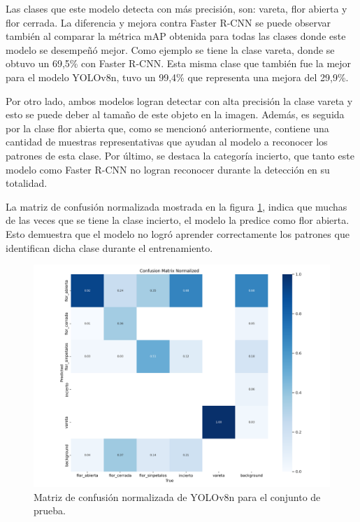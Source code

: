 Las clases que este modelo detecta con más precisión, son: vareta, flor abierta y flor cerrada. La diferencia y mejora contra Faster R-CNN se puede observar también al comparar la métrica mAP obtenida para todas las clases donde este modelo se desempeñó mejor. Como ejemplo se tiene la clase vareta, donde se obtuvo un 69,5\% con Faster R-CNN. Esta misma clase que también fue la mejor para el modelo YOLOv8n, tuvo un 99,4\% que representa una mejora del 29,9\%.

Por otro lado, ambos modelos  logran detectar con alta precisión la clase vareta y esto se puede deber al tamaño de este objeto en la imagen. Además, es seguida por la clase flor abierta que, como se mencionó anteriormente, contiene una cantidad de muestras representativas que ayudan al modelo a reconocer los patrones de esta clase. Por último, se destaca la categoría incierto, que tanto este modelo como Faster R-CNN no logran reconocer durante la detección en su totalidad.

La matriz de confusión normalizada mostrada en la figura \ref{fig:cfmatriznorm}, indica que muchas de las veces que se tiene la clase incierto, el modelo la predice como flor abierta. Esto demuestra que el modelo no logró aprender correctamente los patrones que identifican dicha clase durante el entrenamiento.

\begin{figure}[ht]
	\centering
	\includegraphics[scale=0.49]{./Figures/CFMatrixnorm.png}
	\caption{Matriz de confusión normalizada de YOLOv8n para el conjunto de prueba.}
	\label{fig:cfmatriznorm}
\end{figure}
\newpage
